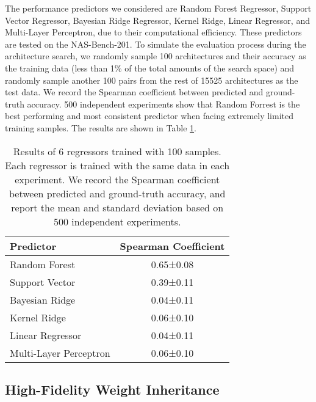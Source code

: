 \documentclass[sigconf]{acmart}
\begin{document}
The performance predictors we considered are Random Forest Regressor, Support Vector Regressor, Bayesian Ridge Regressor, Kernel Ridge, Linear Regressor, and Multi-Layer Perceptron, due to their computational efficiency.  These predictors are tested on the NAS-Bench-201.  
To simulate the evaluation process during the architecture search, we randomly sample 100 architectures and their accuracy as the training data (less than 1\% of the total amounts of the search space) and randomly sample another 100 pairs from the rest of 15525 architectures as the test data.  We record the Spearman coefficient between predicted and ground-truth accuracy.
500 independent experiments show that Random Forrest is the best performing and most consistent predictor when facing extremely limited training samples.  The results are shown in Table \ref{predictors}.

\begin{table}[!h]
\centering
\begin{tabular}{l|c}
\hline
\textbf{Predictor}     & \textbf{Spearman Coefficient} \\ \hline
Random Forest          & 0.65±0.08                     \\ \hline
Support Vector         & 0.39±0.11                     \\ \hline
Bayesian Ridge         & 0.04±0.11                     \\ \hline
Kernel Ridge           & 0.06±0.10                     \\ \hline
Linear Regressor       & 0.04±0.11                     \\ \hline
Multi-Layer Perceptron & 0.06±0.10                     \\ \hline
\end{tabular}
\caption{Results of 6 regressors trained with 100 samples.  Each regressor is trained with the same data in each experiment.  We record the Spearman coefficient between predicted and ground-truth accuracy, and report the mean and standard deviation based on 500 independent experiments.}
\label{predictors}
\end{table}




\subsection{High-Fidelity Weight Inheritance}
\label{sec:hifi-WI}
\end{document}
